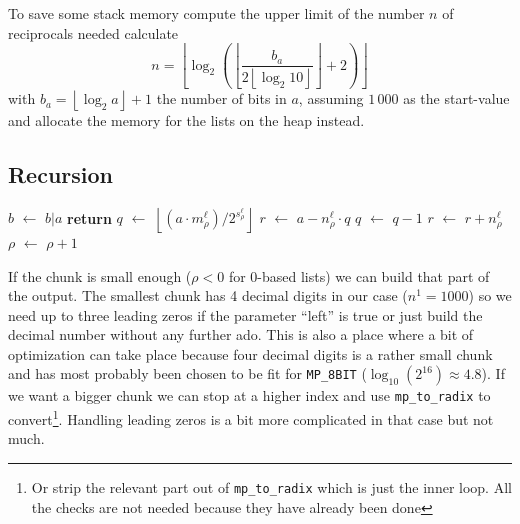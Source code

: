 \documentclass[a4paper,10pt]{article}
\newcommand*\Let[2]{\State #1 $\gets$ #2}
\newcommand{\RETURN}{\State \textbf{return} }
\providecommand{\floor}[1]{\left\lfloor#1\right\rfloor}
\DeclareMathOperator{\AND}{\wedge}
\theoremstyle{plain} %
\theoremstyle{definition}
\theoremstyle{remark}
\newcommand*{\smalltt}[1]{\small\texttt{#1}}
\begin{document}
To save some stack memory compute the upper limit of the number $n$ of reciprocals needed calculate
\begin{equation}
n = \floor{\log_2 \left( \floor{\frac{b_a}{2\floor{\log_2 10}}} + 2 \right)  }
\end{equation}
with $b_a = \floor{\log_2 a} + 1$ the number of bits in $a$, assuming $1\,000$ as the start-value and allocate the memory for the lists on the heap instead.

\subsection{Recursion}

\begin{center}
\begin{minipage}{.9\linewidth}
  \begin{algorithmic}[1]
      \Let{$b$}{$b | a$}
      \RETURN
    \Else
      \Let{$q$}{$\floor{\left(a\cdot m^\ell_\rho\right) / 2^{s^\ell_\rho}}$}
      \Let{$r$}{$ a - n^\ell_\rho \cdot q$}
        \Let{$q$}{$q - 1$}
        \Let{$r$}{$r + n^\ell_\rho$}
      \EndIf
      \Let{$\rho$}{$\rho + 1$}
      \If{$\left(L = 1\right) \AND \left(q = 0\right) $}
        \State {}
      \Else
        \State {}
        \State {}
      \EndIf
    \EndIf
    \EndFunction
  \end{algorithmic}
 \end{minipage}
\end{center}

If the chunk is small enough ($\rho < 0$ for 0-based lists) we can build that part of the output.
The smallest chunk has 4 decimal digits in our case ($n^1 = 1000$) so we need up to three leading zeros if the parameter ``left'' is true or just build the decimal number without any further ado.
This is also a place where a bit of optimization can take place because four decimal digits is a rather small chunk and has most probably been chosen to be fit for \smalltt{MP\_8BIT} ($\log_{10}(2^{16}) \approx 4.8$).
If we want a bigger chunk we can stop at a higher index and use \smalltt{mp\_to\_radix} to convert\footnote{Or strip the relevant part out of \smalltt{mp\_to\_radix} which is just the inner loop. All the checks are not needed because they have already been done}. Handling leading zeros is a bit more complicated in that case but not much.
\end{document}
